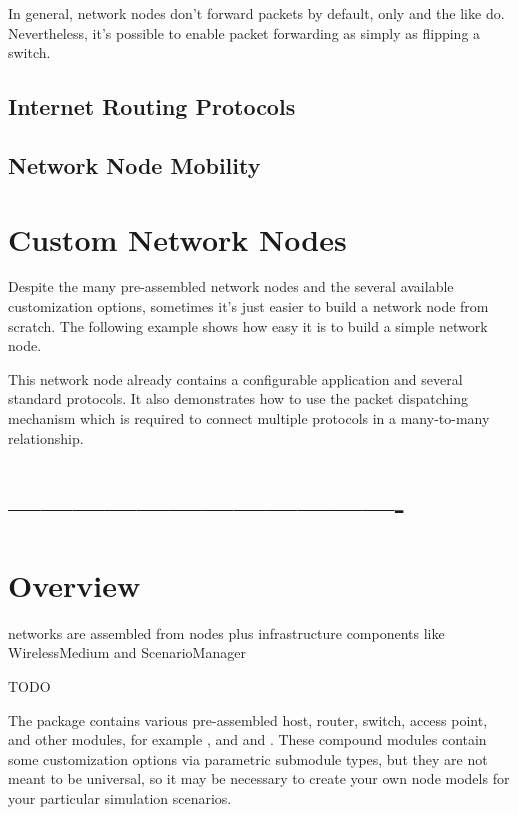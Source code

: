 In general, network nodes don't forward packets by default, only
 and the like do. Nevertheless, it's possible to enable
packet forwarding as simply as flipping a switch.


\subsection{Internet Routing Protocols}


\subsection{Network Node Mobility}


\section{Custom Network Nodes}

Despite the many pre-assembled network nodes and the several available
customization options, sometimes it's just easier to build a network node
from scratch. The following example shows how easy it is to build a simple
network node.

This network node already contains a configurable application and several
standard protocols. It also demonstrates how to use the packet dispatching
mechanism which is required to connect multiple protocols in a many-to-many
relationship.



\section{-------------------------------------}

\section{Overview}

networks are assembled from nodes plus infrastructure components like WirelessMedium
and ScenarioManager 

TODO

The  package contains various pre-assembled host, router,
switch, access point, and other modules, for example
,  and  and
. These compound modules contain some customization
options via parametric submodule types, but they are not meant to be
universal, so it may be necessary to create your own node models for
your particular simulation scenarios.

